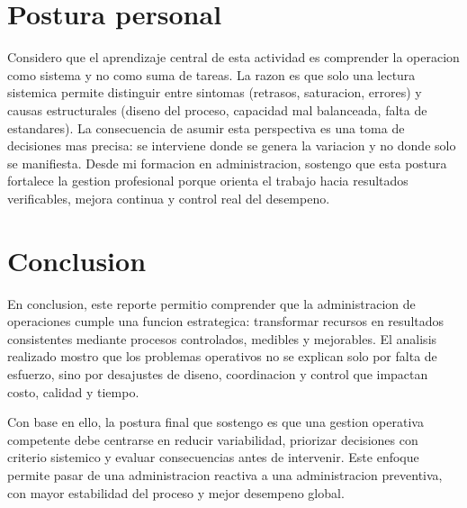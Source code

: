 \documentclass[
	spanish,
	letterpaper, oneside
]{article}
\begin{document}
\section{Postura personal}

Considero que el aprendizaje central de esta actividad es comprender la operacion como sistema y no como suma de tareas. La razon es que solo una lectura sistemica permite distinguir entre sintomas (retrasos, saturacion, errores) y causas estructurales (diseno del proceso, capacidad mal balanceada, falta de estandares). La consecuencia de asumir esta perspectiva es una toma de decisiones mas precisa: se interviene donde se genera la variacion y no donde solo se manifiesta. Desde mi formacion en administracion, sostengo que esta postura fortalece la gestion profesional porque orienta el trabajo hacia resultados verificables, mejora continua y control real del desempeno.

\section{Conclusion}

En conclusion, este reporte permitio comprender que la administracion de operaciones cumple una funcion estrategica: transformar recursos en resultados consistentes mediante procesos controlados, medibles y mejorables. El analisis realizado mostro que los problemas operativos no se explican solo por falta de esfuerzo, sino por desajustes de diseno, coordinacion y control que impactan costo, calidad y tiempo.

Con base en ello, la postura final que sostengo es que una gestion operativa competente debe centrarse en reducir variabilidad, priorizar decisiones con criterio sistemico y evaluar consecuencias antes de intervenir. Este enfoque permite pasar de una administracion reactiva a una administracion preventiva, con mayor estabilidad del proceso y mejor desempeno global.



\end{document}

